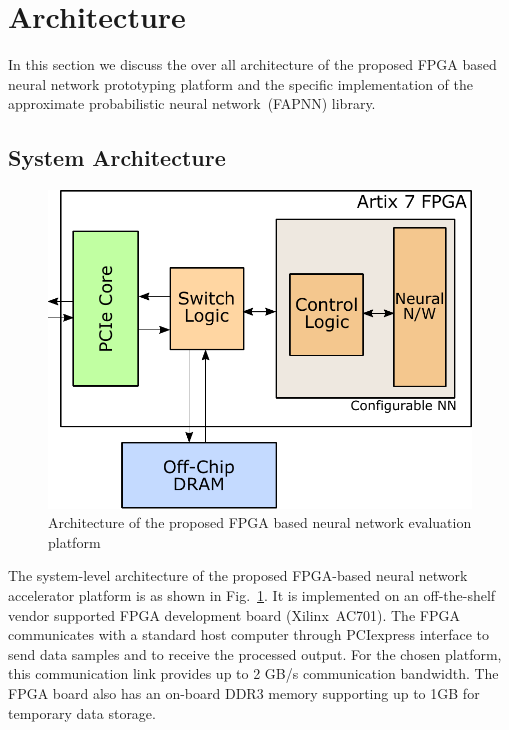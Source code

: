 \section{Architecture}
\label{sec_arch}

In this section we discuss the over all architecture of the proposed FPGA based neural network prototyping platform and the specific implementation of the approximate probabilistic neural network~(FAPNN) library.

\subsection{System Architecture}

\begin{figure}[t]
\centering
   \includegraphics[height=0.7\columnwidth]{Figures/systemarch.pdf}
   \caption{Architecture of the proposed FPGA based neural network evaluation platform}
   \label{fig:sysArch}
\end{figure}

The system-level architecture of the proposed FPGA-based neural network accelerator platform is as shown in Fig.~\ref{fig:sysArch}.
It is implemented on an off-the-shelf vendor supported FPGA development board (Xilinx~AC701).
The FPGA communicates with a standard host computer through PCIexpress interface to send data samples and to receive the processed output.
For the chosen platform, this communication link provides up to 2 GB/s communication bandwidth.
The FPGA board also has an on-board DDR3 memory supporting up to 1GB for temporary data storage.

